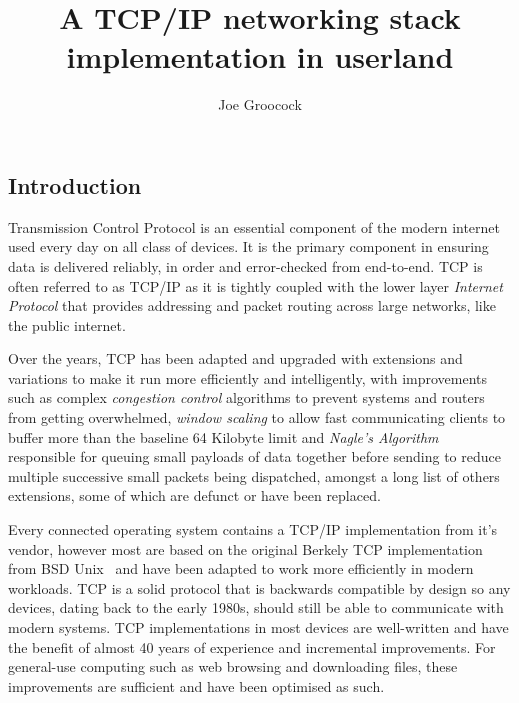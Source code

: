 \documentclass[11pt,a4paper,british]{bhamarticle}
\title{A TCP/IP networking stack implementation in userland}
\author{Joe Groocock}
\begin{document}

\maketitle

\begin{abstract}
\end{abstract}


\begin{multicols}{2}

\section{Introduction}
Transmission Control Protocol is an essential component of the modern internet used every day on all class of devices. It is the primary component in ensuring data is delivered reliably, in order and error-checked from end-to-end. TCP is often referred to as TCP/IP as it is tightly coupled with the lower layer \textit{Internet Protocol} that provides addressing and packet routing across large networks, like the public internet.

Over the years, TCP has been adapted and upgraded with extensions and variations to make it run more efficiently and intelligently, with improvements such as complex \textit{congestion control} algorithms to prevent systems and routers from getting overwhelmed, \textit{window scaling} to allow fast communicating clients to buffer more than the baseline 64 Kilobyte limit and \textit{Nagle's Algorithm}~\cite{rfc896} responsible for queuing small payloads of data together before sending to reduce multiple successive small packets being dispatched, amongst a long list of others extensions, some of which are defunct or have been replaced.

Every connected operating system contains a TCP/IP implementation from it's vendor, however most are based on the original Berkely TCP implementation from BSD Unix~\cite{rfc793} and have been adapted to work more efficiently in modern workloads. TCP is a solid protocol that is backwards compatible by design so any devices, dating back to the early 1980s, should still be able to communicate with modern systems. TCP implementations in most devices are well-written and have the benefit of almost 40 years of experience and incremental improvements. For general-use computing such as web browsing and downloading files, these improvements are sufficient and have been optimised as such.


\end{multicols}
\end{document}
